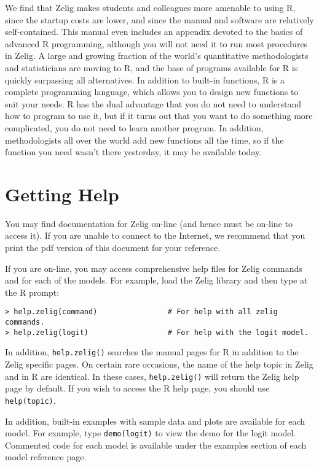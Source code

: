 \documentclass{article}
\begin{document}
We find that Zelig makes students and colleagues more amenable to
using R, since the startup costs are lower, and since the manual and
software are relatively self-contained.  This manual even includes an
appendix devoted to the basics of advanced R programming, although you
will not need it to run most procedures in Zelig.  A large and growing
fraction of the world's quantitative methodologists and statisticians
are moving to R, and the base of programs available for R is quickly
surpassing all alternatives.  In addition to built-in functions, R is
a complete programming language, which allows you to design new
functions to suit your needs.  R has the dual advantage that you do
not need to understand how to program to use it, but if it turns out
that you want to do something more complicated, you do not need to
learn another program.  In addition, methodologists all over the world
add new functions all the time, so if the function you need wasn't
there yesterday, it may be available today.

\section{Getting Help}

You may find documentation for Zelig on-line (and hence must be
on-line to access it).  If you are unable to connect to the Internet,
we recommend that you print the pdf version of this document for your
reference.

If you are on-line, you may access comprehensive help files for Zelig
commands and for each of the models.  For example, load the Zelig
library and then type at the R prompt:
\begin{verbatim}
> help.zelig(command)                # For help with all zelig commands.
> help.zelig(logit)                  # For help with the logit model.  
\end{verbatim}
\label{Rhelp}In addition, {\tt help.zelig()} searches the manual pages 
for R in addition to the Zelig specific pages.  On certain rare
occasions, the name of the help topic in Zelig and in R are identical.
In these cases, {\tt help.zelig()} will return the Zelig help page by
default.  If you wish to access the R help page, you should use {\tt
  help(topic)}.

In addition, built-in examples with sample data and plots are
available for each model.  For example, type {\tt demo(logit)} to view
the demo for the logit model.  Commented code for each model is
available under the examples section of each model reference page.
\end{document}
